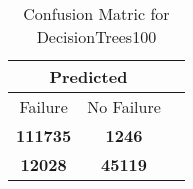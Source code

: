 \begin{table}[] 
\caption{Confusion Matric for DecisionTrees100} 
\label{Table: Prediction Accuracy-DMDDecisionTrees100OnlySunEKF-combinationReflectionEKF-top2perfectNoFailurePrediction-Reflection} 
\centering 
\begin{tabular} 
 {@{}ccc@{}} 
\toprule 
\multicolumn{2}{c}{\textbf{Predicted}}
 \\ \midrule 
\multicolumn{1}{|c|}{Failure} & 
\multicolumn{1}{c|}{No Failure}
 \\ \midrule 
\multicolumn{1}{|c|}{\color{green}\textbf{111735}} & 
\multicolumn{1}{c|}{\color{red}\textbf{1246}}
 \\ \midrule 
\multicolumn{1}{|c|}{\color{red}\textbf{12028}} & 
\multicolumn{1}{c|}{\color{green}\textbf{45119}}
 \\ \bottomrule 
\end{tabular} 
\end{table} 
